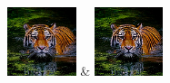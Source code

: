 \begin{table}[h!]
\begin{tabular}
        \includegraphics[width=2cm]{images/processed/tiger/gaussian_5x5_sigma1.0/unblurred_15-iter.png} &
        \includegraphics[width=2cm]{images/processed/tiger/gaussian_5x5_sigma2.0/unblurred_15-iter.png}                                                                                                                                                                                                 \\
    \end{tabular}
\end{table}